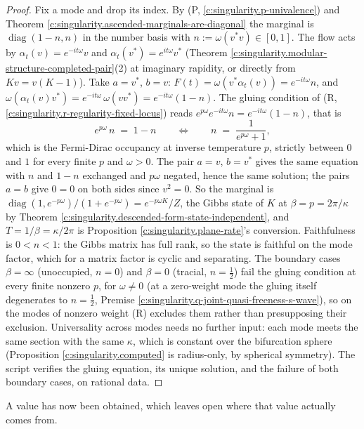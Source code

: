 \documentclass[11pt]{article}
\theoremstyle{definition}
\theoremstyle{plain}
\begin{document}
\begin{proof}
Fix a mode and drop its index. By (P, \ref{c:singularity.p-univalence}) and Theorem \ref{c:singularity.ascended-marginals-are-diagonal} the marginal is $\operatorname{diag}(1 - n, n)$ in the number basis with $n := \omega(v^{*}v) \in [0,1]$. The flow acts by $\alpha_t(v) = e^{-it\omega}v$ and $\alpha_t(v^{*}) = e^{it\omega}v^{*}$ (Theorem \ref{c:singularity.modular-structure-completed-pair}(2) at imaginary rapidity, or directly from $Kv = v(K - 1)$). Take $a = v^{*}$, $b = v$: $F(t) = \omega(v^{*}\alpha_t(v)) = e^{-it\omega}n$, and $\omega(\alpha_t(v)v^{*}) = e^{-it\omega}\,\omega(vv^{*}) = e^{-it\omega}(1 - n)$. The gluing condition of (R, \ref{c:singularity.r-regularity-fixed-locus}) reads $e^{p\omega}e^{-it\omega}n = e^{-it\omega}(1 - n)$, that is
\[
e^{p\omega}\,n \;=\; 1 - n \qquad\Longleftrightarrow\qquad n \;=\; \frac{1}{e^{p\omega} + 1} ,
\]
which is the Fermi-Dirac occupancy at inverse temperature $p$, strictly between $0$ and $1$ for every finite $p$ and $\omega > 0$. The pair $a = v$, $b = v^{*}$ gives the same equation with $n$ and $1 - n$ exchanged and $p\omega$ negated, hence the same solution; the pairs $a = b$ give $0 = 0$ on both sides since $v^{2} = 0$. So the marginal is $\operatorname{diag}(1, e^{-p\omega})/(1 + e^{-p\omega}) = e^{-p\omega K}/Z$, the Gibbs state of $K$ at $\beta = p = 2\pi/\kappa$ by Theorem \ref{c:singularity.descended-form-state-independent}, and $T = 1/\beta = \kappa/2\pi$ is Proposition \ref{c:singularity.plane-rate}'s conversion. Faithfulness is $0 < n < 1$: the Gibbs matrix has full rank, so the state is faithful on the mode factor, which for a matrix factor is cyclic and separating. The boundary cases $\beta = \infty$ (unoccupied, $n = 0$) and $\beta = 0$ (tracial, $n = \tfrac12$) fail the gluing condition at every finite nonzero $p$, for $\omega \neq 0$ (at a zero-weight mode the gluing itself degenerates to $n = \tfrac12$, Premise \ref{c:singularity.q-joint-quasi-freeness-s-wave}), so on the modes of nonzero weight (R) excludes them rather than presupposing their exclusion. Universality across modes needs no further input: each mode meets the same section with the same $\kappa$, which is constant over the bifurcation sphere (Proposition \ref{c:singularity.computed} is radius-only, by spherical symmetry). The script verifies the gluing equation, its unique solution, and the failure of both boundary cases, on rational data.

\end{proof}

A value has now been obtained, which leaves open where that value actually comes from.
\end{document}

